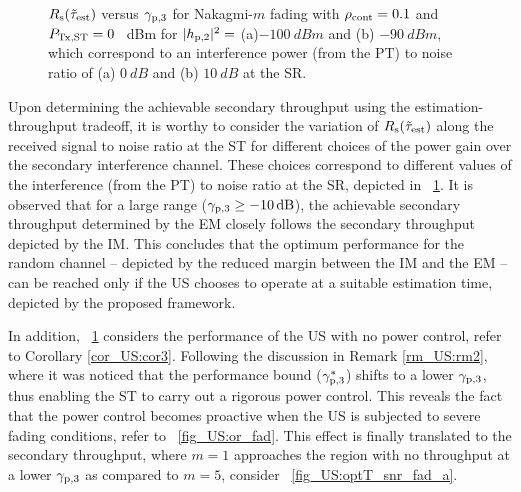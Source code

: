 \begin{figure}[!ht]
{
\label{fig_US:optT_snr_fad_b}
}
\caption{$R_{\text{s}}(\tilde{\tau}_{\text{est}})$ versus ${\gamma}_{\text{p,3}}$ for Nakagmi-$m$ fading with $\rho_{\text{cont}} = 0.1$ and $P_{\text{Tx,ST}} = 0$ \SI{}{dBm} for $|h_{\text{p,2}}|^2 =$ (a)$\SI{-100}{dBm}$ and (b) $ \SI{-90}{dBm}$, which correspond to an interference power (from the PT) to noise ratio of (a) $\SI{0}{dB}$ and (b) $\SI{10}{dB}$ at the SR.}
\label{fig_US:optT_snr_fad}
\end{figure}

Upon determining the achievable secondary throughput using the estimation-throughput tradeoff, it is worthy to consider the variation of $R_{\text{s}}(\tilde{\tau}_{\text{est}})$ along the received signal to noise ratio at the ST for different choices of the power gain over the secondary interference channel. These choices correspond to different values of the interference (from the PT) to noise ratio at the SR, depicted in \figurename~\ref{fig_US:optT_snr_fad}. It is observed that for a large range (${\gamma}_{\text{p,3}} \ge \SI{-10}{dB}$), the achievable secondary throughput determined by the EM closely follows the secondary throughput depicted by the IM. This concludes that the optimum performance for the random channel -- depicted by the reduced margin between the IM and the EM -- can be reached only if the US chooses to operate at a suitable estimation time, depicted by the proposed framework. 

In addition, \figurename~\ref{fig_US:optT_snr_fad} considers the performance of the US with no power control, refer to Corollary \ref{cor_US:cor3}. Following the discussion in Remark \ref{rm_US:rm2}, where it was noticed that the performance bound (${\gamma}_{\text{p,3}}^*$) shifts to a lower ${\gamma}_{\text{p,3}}$, thus enabling the ST to carry out a rigorous power control. This reveals the fact that the power control becomes proactive when the US is subjected to severe fading conditions, refer to \figurename~\ref{fig_US:or_fad}. This effect is finally translated to the secondary throughput, where $m = 1$ approaches the region with no throughput at a lower ${\gamma}_{\text{p,3}}$ as compared to $m = 5$, consider \figurename~\ref{fig_US:optT_snr_fad_a}. 

